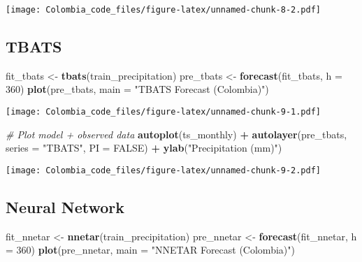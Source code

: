 \documentclass[
]{article}
\newenvironment{Shaded}{\begin{snugshade}}{\end{snugshade}}
\newcommand{\AttributeTok}[1]{\textcolor[rgb]{0.13,0.29,0.53}{#1}}
\newcommand{\CommentTok}[1]{\textcolor[rgb]{0.56,0.35,0.01}{\textit{#1}}}
\newcommand{\ConstantTok}[1]{\textcolor[rgb]{0.56,0.35,0.01}{#1}}
\newcommand{\DecValTok}[1]{\textcolor[rgb]{0.00,0.00,0.81}{#1}}
\newcommand{\FunctionTok}[1]{\textcolor[rgb]{0.13,0.29,0.53}{\textbf{#1}}}
\newcommand{\NormalTok}[1]{#1}
\newcommand{\OtherTok}[1]{\textcolor[rgb]{0.56,0.35,0.01}{#1}}
\newcommand{\SpecialCharTok}[1]{\textcolor[rgb]{0.81,0.36,0.00}{\textbf{#1}}}
\newcommand{\StringTok}[1]{\textcolor[rgb]{0.31,0.60,0.02}{#1}}
\begin{document}
\texttt{[image: Colombia\_code\_files/figure-latex/unnamed-chunk-8-2.pdf]}

\subsection{TBATS}\label{tbats}

\begin{Shaded}
\begin{Highlighting}[]
\NormalTok{fit\_tbats }\OtherTok{\textless{}{-}} \FunctionTok{tbats}\NormalTok{(train\_precipitation)}
\NormalTok{pre\_tbats }\OtherTok{\textless{}{-}} \FunctionTok{forecast}\NormalTok{(fit\_tbats, }\AttributeTok{h =} \DecValTok{360}\NormalTok{)}
\FunctionTok{plot}\NormalTok{(pre\_tbats, }\AttributeTok{main =} \StringTok{"TBATS Forecast (Colombia)"}\NormalTok{)}
\end{Highlighting}
\end{Shaded}

\texttt{[image: Colombia\_code\_files/figure-latex/unnamed-chunk-9-1.pdf]}

\begin{Shaded}
\begin{Highlighting}[]
\CommentTok{\# Plot model + observed data}
\FunctionTok{autoplot}\NormalTok{(ts\_monthly) }\SpecialCharTok{+} \FunctionTok{autolayer}\NormalTok{(pre\_tbats, }\AttributeTok{series =} \StringTok{"TBATS"}\NormalTok{,}
    \AttributeTok{PI =} \ConstantTok{FALSE}\NormalTok{) }\SpecialCharTok{+} \FunctionTok{ylab}\NormalTok{(}\StringTok{"Precipitation (mm)"}\NormalTok{)}
\end{Highlighting}
\end{Shaded}

\texttt{[image: Colombia\_code\_files/figure-latex/unnamed-chunk-9-2.pdf]}

\subsection{Neural Network}\label{neural-network}

\begin{Shaded}
\begin{Highlighting}[]
\NormalTok{fit\_nnetar }\OtherTok{\textless{}{-}} \FunctionTok{nnetar}\NormalTok{(train\_precipitation)}
\NormalTok{pre\_nnetar }\OtherTok{\textless{}{-}} \FunctionTok{forecast}\NormalTok{(fit\_nnetar, }\AttributeTok{h =} \DecValTok{360}\NormalTok{)}
\FunctionTok{plot}\NormalTok{(pre\_nnetar, }\AttributeTok{main =} \StringTok{"NNETAR Forecast (Colombia)"}\NormalTok{)}
\end{Highlighting}
\end{Shaded}
\end{document}
